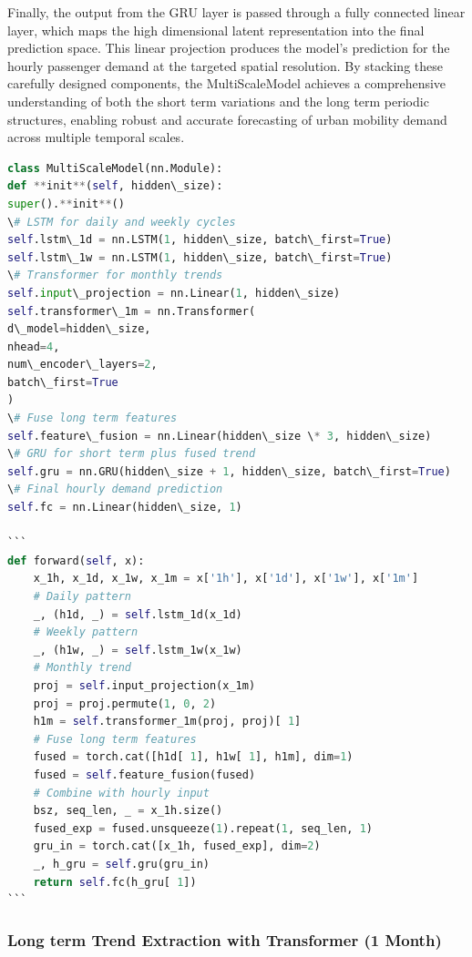 \documentclass{article}
\begin{document}
Finally, the output from the GRU layer is passed through a fully connected linear layer, which maps the high dimensional latent representation into the final prediction space. This linear projection produces the model’s prediction for the hourly passenger demand at the targeted spatial resolution. By stacking these carefully designed components, the MultiScaleModel achieves a comprehensive understanding of both the short term variations and the long term periodic structures, enabling robust and accurate forecasting of urban mobility demand across multiple temporal scales.

\newpage

\begin{lstlisting}[language=Python, caption={MS RNN Module Definition}]
class MultiScaleModel(nn.Module):
def **init**(self, hidden\_size):
super().**init**()
\# LSTM for daily and weekly cycles
self.lstm\_1d = nn.LSTM(1, hidden\_size, batch\_first=True)
self.lstm\_1w = nn.LSTM(1, hidden\_size, batch\_first=True)
\# Transformer for monthly trends
self.input\_projection = nn.Linear(1, hidden\_size)
self.transformer\_1m = nn.Transformer(
d\_model=hidden\_size,
nhead=4,
num\_encoder\_layers=2,
batch\_first=True
)
\# Fuse long term features
self.feature\_fusion = nn.Linear(hidden\_size \* 3, hidden\_size)
\# GRU for short term plus fused trend
self.gru = nn.GRU(hidden\_size + 1, hidden\_size, batch\_first=True)
\# Final hourly demand prediction
self.fc = nn.Linear(hidden\_size, 1)

```
def forward(self, x):
    x_1h, x_1d, x_1w, x_1m = x['1h'], x['1d'], x['1w'], x['1m']
    # Daily pattern
    _, (h1d, _) = self.lstm_1d(x_1d)
    # Weekly pattern
    _, (h1w, _) = self.lstm_1w(x_1w)
    # Monthly trend
    proj = self.input_projection(x_1m)
    proj = proj.permute(1, 0, 2)
    h1m = self.transformer_1m(proj, proj)[ 1]
    # Fuse long term features
    fused = torch.cat([h1d[ 1], h1w[ 1], h1m], dim=1)
    fused = self.feature_fusion(fused)
    # Combine with hourly input
    bsz, seq_len, _ = x_1h.size()
    fused_exp = fused.unsqueeze(1).repeat(1, seq_len, 1)
    gru_in = torch.cat([x_1h, fused_exp], dim=2)
    _, h_gru = self.gru(gru_in)
    return self.fc(h_gru[ 1])
```

\end{lstlisting}
\subsubsection{Long term Trend Extraction with Transformer (1 Month)}
\end{document}
